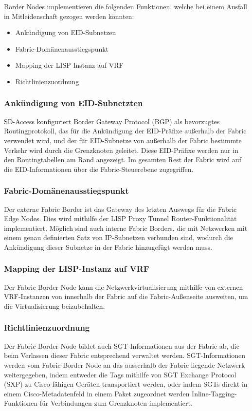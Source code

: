 Border Nodes implementieren die folgenden Funktionen, welche bei einem Ausfall in Mitleidenschaft gezogen werden könnten\cite{sda-designguide-sept2018}:
\begin{itemize}
	\item Ankündigung von EID-Subnetzen
	\item Fabric-Domänenausstiegspunkt
	\item Mapping der LISP-Instanz auf VRF
	\item Richtlinienzuordnung
\end{itemize}

\subsubsection{Ankündigung von EID-Subnetzten}
SD-Access konfiguriert Border Gateway Protocol (BGP) als bevorzugtes Routingprotokoll, das für die Ankündigung der EID-Präfixe außerhalb der Fabric verwendet wird, und der für EID-Subnetze von außerhalb der Fabric bestimmte Verkehr wird durch die Grenzknoten geleitet. Diese EID-Präfixe werden nur in den Routingtabellen am Rand angezeigt. Im gesamten Rest der Fabric wird auf die EID-Informationen über die Fabric-Steuerebene zugegriffen.

\subsubsection{Fabric-Domänenausstiegspunkt}
Der externe Fabric Border ist das Gateway des letzten Auswegs für die Fabric Edge Nodes. Dies wird mithilfe der LISP Proxy Tunnel Router-Funktionalität implementiert. Möglich sind auch interne Fabric Borders, die mit Netzwerken mit einem genau definierten Satz von IP-Subnetzen verbunden sind, wodurch die Ankündigung dieser Subnetze in der Fabric hinzugefügt werden muss.

\subsubsection{Mapping der LISP-Instanz auf VRF}
Der Fabric Border Node kann die Netzwerkvirtualisierung mithilfe von externen VRF-Instanzen von innerhalb der Fabric auf die Fabric-Außenseite ausweiten, um die Virtualisierung beizubehalten.

\subsubsection{Richtlinienzuordnung}
Der Fabric Border Node bildet auch SGT-Informationen aus der Fabric ab, die beim Verlassen dieser Fabric entsprechend verwaltet werden. SGT-Informationen werden vom Fabric Border Node an das ausserhalb der Fabric liegende Netzwerk weitergegeben, indem entweder die Tags mithilfe von SGT Exchange Protocol (SXP) zu Cisco-fähigen Geräten transportiert werden, oder indem SGTs direkt in einem Cisco-Metadatenfeld in einem Paket zugeordnet werden Inline-Tagging-Funktionen für Verbindungen zum Grenzknoten implementiert.

